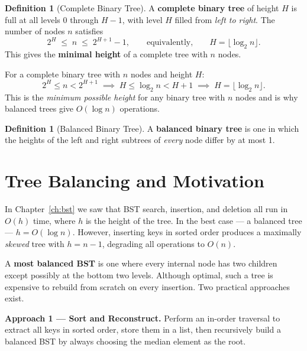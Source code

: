 \documentclass[11pt, a4paper, notitlepage]{report}
\theoremstyle{definition}
\newtheorem{definition}[theorem]{Definition}
\theoremstyle{remark}
\theoremstyle{definition}
\begin{document}
\begin{definition}[Complete Binary Tree]
\label{def:complete-tree}
A \textbf{complete binary tree} of height $H$ is full at all levels $0$ through $H-1$,
with level $H$ filled from \emph{left to right}.  The number of nodes $n$ satisfies
\[
  2^{H} \;\leq\; n \;\leq\; 2^{H+1} - 1,
  \qquad\text{equivalently,}\qquad
  H = \lfloor \log_2 n \rfloor.
\]
This gives the \textbf{minimal height} of a complete tree with $n$ nodes.
\end{definition}

\begin{keyresult}[title={Key Result: Height Bound for Complete Trees}]
For a complete binary tree with $n$ nodes and height $H$:
\[
  2^H \leq n < 2^{H+1}
  \;\implies\;
  H \leq \log_2 n < H+1
  \;\implies\;
  H = \lfloor \log_2 n \rfloor.
\]
This is the \emph{minimum possible height} for any binary tree with $n$ nodes and
is why balanced trees give $O(\log n)$ operations.
\end{keyresult}

\begin{definition}[Balanced Binary Tree]
\label{def:balanced-tree}
A \textbf{balanced binary tree} is one in which the heights of the left and right subtrees
of \emph{every} node differ by at most 1.
\end{definition}

\section{Tree Balancing and Motivation}
\label{sec:tree-balancing}

In Chapter~\ref{ch:bst} we saw that BST search, insertion, and deletion all run in
$O(h)$ time, where $h$ is the height of the tree.  In the best case --- a balanced tree ---
$h = O(\log n)$.  However, inserting keys in sorted order produces a maximally \emph{skewed}
tree with $h = n - 1$, degrading all operations to $O(n)$.

A \textbf{most balanced BST} is one where every internal node has two children except
possibly at the bottom two levels.  Although optimal, such a tree is expensive to rebuild
from scratch on every insertion.  Two practical approaches exist.

\textbf{Approach 1 --- Sort and Reconstruct.}  Perform an in-order traversal to extract all
keys in sorted order, store them in a list, then recursively build a balanced BST by always
choosing the median element as the root.
\end{document}
